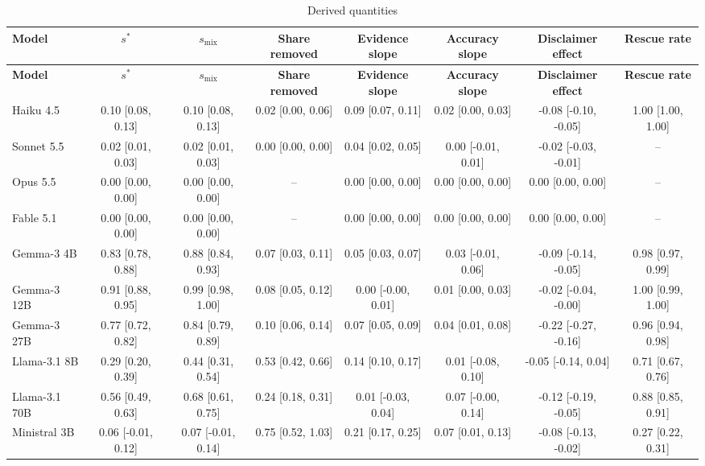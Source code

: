 \documentclass[10pt,a4paper]{article}
\begin{document}
\begin{scriptsize}
\setlength{\tabcolsep}{2pt}
\begin{longtable}{lccccccc}
\caption{Derived quantities}\\
\toprule
\textbf{Model} & \textbf{$s^{*}$} & \textbf{$s_{\mathrm{mix}}$} & \textbf{Share removed} & \textbf{Evidence slope} & \textbf{Accuracy slope} & \textbf{Disclaimer effect} & \textbf{Rescue rate} \\
\midrule
\endfirsthead
\toprule
\textbf{Model} & \textbf{$s^{*}$} & \textbf{$s_{\mathrm{mix}}$} & \textbf{Share removed} & \textbf{Evidence slope} & \textbf{Accuracy slope} & \textbf{Disclaimer effect} & \textbf{Rescue rate} \\
\midrule
\endhead
\bottomrule
\endfoot
Haiku 4.5 & 0.10 [0.08, 0.13] & 0.10 [0.08, 0.13] & 0.02 [0.00, 0.06] & 0.09 [0.07, 0.11] & 0.02 [0.00, 0.03] & -0.08 [-0.10, -0.05] & 1.00 [1.00, 1.00] \\
Sonnet 5.5 & 0.02 [0.01, 0.03] & 0.02 [0.01, 0.03] & 0.00 [0.00, 0.00] & 0.04 [0.02, 0.05] & 0.00 [-0.01, 0.01] & -0.02 [-0.03, -0.01] & -- \\
Opus 5.5 & 0.00 [0.00, 0.00] & 0.00 [0.00, 0.00] & -- & 0.00 [0.00, 0.00] & 0.00 [0.00, 0.00] & 0.00 [0.00, 0.00] & -- \\
Fable 5.1 & 0.00 [0.00, 0.00] & 0.00 [0.00, 0.00] & -- & 0.00 [0.00, 0.00] & 0.00 [0.00, 0.00] & 0.00 [0.00, 0.00] & -- \\
Gemma-3 4B & 0.83 [0.78, 0.88] & 0.88 [0.84, 0.93] & 0.07 [0.03, 0.11] & 0.05 [0.03, 0.07] & 0.03 [-0.01, 0.06] & -0.09 [-0.14, -0.05] & 0.98 [0.97, 0.99] \\
Gemma-3 12B & 0.91 [0.88, 0.95] & 0.99 [0.98, 1.00] & 0.08 [0.05, 0.12] & 0.00 [-0.00, 0.01] & 0.01 [0.00, 0.03] & -0.02 [-0.04, -0.00] & 1.00 [0.99, 1.00] \\
Gemma-3 27B & 0.77 [0.72, 0.82] & 0.84 [0.79, 0.89] & 0.10 [0.06, 0.14] & 0.07 [0.05, 0.09] & 0.04 [0.01, 0.08] & -0.22 [-0.27, -0.16] & 0.96 [0.94, 0.98] \\
Llama-3.1 8B & 0.29 [0.20, 0.39] & 0.44 [0.31, 0.54] & 0.53 [0.42, 0.66] & 0.14 [0.10, 0.17] & 0.01 [-0.08, 0.10] & -0.05 [-0.14, 0.04] & 0.71 [0.67, 0.76] \\
Llama-3.1 70B & 0.56 [0.49, 0.63] & 0.68 [0.61, 0.75] & 0.24 [0.18, 0.31] & 0.01 [-0.03, 0.04] & 0.07 [-0.00, 0.14] & -0.12 [-0.19, -0.05] & 0.88 [0.85, 0.91] \\
Ministral 3B & 0.06 [-0.01, 0.12] & 0.07 [-0.01, 0.14] & 0.75 [0.52, 1.03] & 0.21 [0.17, 0.25] & 0.07 [0.01, 0.13] & -0.08 [-0.13, -0.02] & 0.27 [0.22, 0.31] \\

\end{longtable}
\end{scriptsize}
\end{document}
